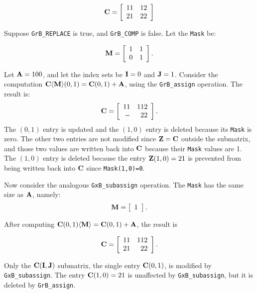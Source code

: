 \documentclass[12pt]{article}
\begin{document}
\[
{\bf C} = \left[
    \begin{array}{rr}
    11 & 12 \\
    21 & 22 \\
    \end{array}
    \right]
\]

Suppose \verb'GrB_REPLACE' is true, and \verb'GrB_COMP' is false.  Let the
\verb'Mask' be:

\[
{\bf M} = \left[
    \begin{array}{rr}
    1 & 1 \\
    0 & 1 \\
    \end{array}
    \right].
\]

Let ${\bf A} = 100$, and let the index sets be ${\bf I}=0$ and ${\bf J}=1$.
Consider the computation
${\bf C \langle M \rangle} (0,1) = {\bf C}(0,1) + {\bf A}$,
using the \verb'GrB_assign' operation.  The result is:
\[
{\bf C} = \left[
    \begin{array}{rr}
    11 & 112 \\
     - &  22 \\
    \end{array}
    \right].
\]
The $(0,1)$ entry is updated and the $(1,0)$ entry is deleted because
its \verb'Mask' is zero.  The other two entries are not modified since ${\bf Z}
= {\bf C}$ outside the submatrix, and those two values are written back into
${\bf C}$ because their \verb'Mask' values are 1.  The $(1,0)$ entry is deleted
because the entry ${\bf Z}(1,0)=21$ is prevented from being written back into
${\bf C}$ since \verb'Mask(1,0)=0'.

Now consider the analogous \verb'GxB_subassign' operation.  The \verb'Mask' has
the same size as ${\bf A}$, namely:
\[
{\bf M} = \left[
    \begin{array}{r}
    1 \\
    \end{array}
    \right].
\]

After computing
${\bf C} (0,1) {\bf \langle M \rangle} = {\bf C}(0,1) + {\bf A}$,
the result is

\[
{\bf C} = \left[
    \begin{array}{rr}
    11 & 112 \\
    21 &  22 \\
    \end{array}
    \right].
\]

Only the ${\bf C(I,J)}$ submatrix, the single entry ${\bf C}(0,1)$, is modified
by \verb'GxB_subassign'.  The entry ${\bf C}(1,0)=21$ is unaffected by
\verb'GxB_subassign', but it is deleted by \verb'GrB_assign'.
\end{document}
